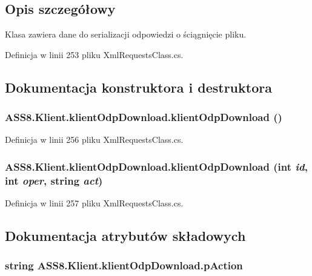 \subsection{Opis szczegółowy}
Klasa zawiera dane do serializacji odpowiedzi o ściągnięcie pliku. 



Definicja w linii 253 pliku XmlRequestsClass.cs.

\subsection{Dokumentacja konstruktora i destruktora}
\hypertarget{a00010_39b02a7d62f5f5d1fc3f027bc1ab666b}{
\subsubsection[{klientOdpDownload}]{\setlength{\rightskip}{0pt plus 5cm}ASS8.Klient.klientOdpDownload.klientOdpDownload ()}}
\label{d7/dec/a00010_39b02a7d62f5f5d1fc3f027bc1ab666b}




Definicja w linii 256 pliku XmlRequestsClass.cs.\hypertarget{a00010_31174bd92b052586e1bb093bf631f330}{
\subsubsection[{klientOdpDownload}]{\setlength{\rightskip}{0pt plus 5cm}ASS8.Klient.klientOdpDownload.klientOdpDownload (int {\em id}, \/  int {\em oper}, \/  string {\em act})}}
\label{d7/dec/a00010_31174bd92b052586e1bb093bf631f330}




Definicja w linii 257 pliku XmlRequestsClass.cs.

\subsection{Dokumentacja atrybutów składowych}
\hypertarget{a00010_50dcb80ebd84c9929250c659e169fea9}{
\subsubsection[{pAction}]{\setlength{\rightskip}{0pt plus 5cm}string {\bf ASS8.Klient.klientOdpDownload.pAction}}}
\label{d7/dec/a00010_50dcb80ebd84c9929250c659e169fea9}




